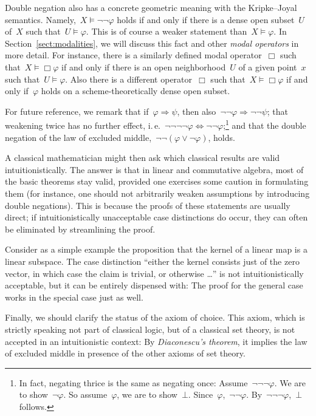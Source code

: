 \documentclass[10pt,reqno,a4paper]{amsbook}
\makeatletter
\theoremstyle{definition}
\theoremstyle{plain}
\theoremstyle{remark}
\newcommand{\?}{\,{:}\,}
\renewcommand{\_}{\mathpunct{.}\,}
\newcommand{\ie}{i.\,e.\@\xspace}
\makeatother
\begin{document}
Double negation also has a concrete geometric meaning with the
Kripke--Joyal semantics. Namely,~$X \models \neg\neg\varphi$ holds if and
only if there is a dense open subset~$U$ of~$X$ such that~$U \models \varphi$.
This is of course a weaker statement than~$X \models \varphi$.
In Section~\ref{sect:modalities}, we will discuss this fact and other
\emph{modal operators} in more detail. For instance, there is a similarly defined modal
operator~$\Box$ such that~$X \models \Box\varphi$ if and only if there is an
open neighborhood~$U$ of a given point~$x$ such that~$U \models \varphi$. Also
there is a different operator~$\Box$ such that~$X \models \Box\varphi$ if and only
if~$\varphi$ holds on a scheme-theoretically dense open subset.

For future reference, we remark that if~$\varphi \Rightarrow \psi$,
then also~$\neg\neg\varphi \Rightarrow \neg\neg\psi$; that weakening
twice has no further effect, \ie~$\neg\neg\neg\neg\varphi \Leftrightarrow
\neg\neg\varphi$;\footnote{In fact, negating thrice is the same as negating
once: Assume~$\neg\neg\neg\varphi$. We are to show~$\neg\varphi$. So
assume~$\varphi$, we are to show~$\bot$. Since~$\varphi$,~$\neg\neg\varphi$.
By~$\neg\neg\neg\varphi$,~$\bot$ follows.} and that the double negation of the
law of excluded middle,~$\neg\neg(\varphi \vee \neg\varphi)$, holds.

A classical mathematician might then ask which classical results are valid
intuitionistically. The answer is that in linear and commutative algebra, most
of the basic theorems stay valid, provided one exercises some caution in
formulating them (for instance, one should not arbitrarily weaken assumptions
by introducing double negations). This is because the proofs of these
statements are usually direct; if intuitionistically unacceptable case
distinctions do occur, they can often be eliminated by streamlining the proof.

Consider as a simple example the proposition that the kernel of a linear map is
a linear subspace. The case distinction ``either the kernel consists just of the
zero vector, in which case the claim is trivial, or otherwise \ldots'' is not
intuitionistically acceptable, but it can be entirely dispensed with: The proof
for the general case works in the special case just as well.

Finally, we should clarify the status of the axiom of choice. This axiom, which
is strictly speaking not part of classical logic, but of a classical set
theory, is not accepted in an intuitionistic context: By \emph{Diaconescu's
theorem}, it implies the law of excluded middle in presence of the other axioms
of set theory.
\end{document}
